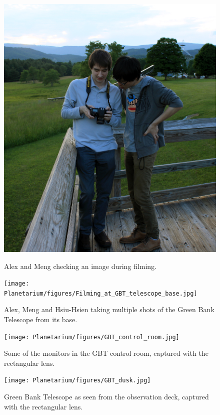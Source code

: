 \begin{figure}[htb]
\centering
\begin{minipage}[b]{0.39\textwidth}
\centering
\includegraphics[width=0.95\linewidth]{Planetarium/figures/Filming_at_GBT_obs_deck.jpg}
\caption{Alex and Meng checking an image during filming.}
\label{Fig:GBT_obs_deck_film}
\end{minipage}%
\begin{minipage}[b]{0.02\textwidth}
\hspace{1cm}
\end{minipage}%
\begin{minipage}[b]{0.55\textwidth}
\centering
\texttt{[image: Planetarium/figures/Filming\_at\_GBT\_telescope\_base.jpg]}
\caption{Alex, Meng and Hsiu-Hsien taking multiple shots of the Green Bank Telescope from its base.}
\label{Fig:GBT_base_film}
\end{minipage}
\end{figure}

\begin{figure}[htb]
\centering
\begin{minipage}[b]{0.51\textwidth}
\centering
\texttt{[image: Planetarium/figures/GBT\_control\_room.jpg]}
\caption{Some of the monitors in the GBT control room, captured with the rectangular lens. }
\label{Fig:GBT_control}
\end{minipage}%
\begin{minipage}[b]{0.02\textwidth}
\hspace{1cm}
\end{minipage}%
\begin{minipage}[b]{0.43\textwidth}
\centering
\texttt{[image: Planetarium/figures/GBT\_dusk.jpg]}
\caption{Green Bank Telescope as seen from the observation deck, captured with the rectangular lens.}
\label{Fig:GBT_dusk}
\end{minipage}
\end{figure}


